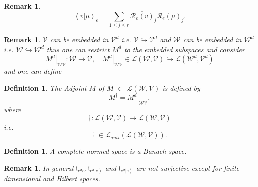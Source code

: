 \documentclass[aps,preprint]{revtex4}%
\newtheorem{definition}[theorem]{Definition}
\newtheorem{remark}[theorem]{Remark}
\begin{document}
\begin{remark}%
\begin{equation}
\left\langle \left.  v\right\vert \mu\right\rangle _{e}=\sum_{1\leq j\leq
r}\overline{\mathcal{R}_{e}\left(  v\right)  }_{j}\mathcal{R}_{e}\left(
\mu\right)  _{j}.
\end{equation}

\end{remark}

\begin{remark}
$\mathcal{V}$ can be embedded in $\mathcal{V}^{d}$ i.e.
$\mathcal{V\hookrightarrow V}^{d}$ and $\mathcal{W}$ can be embedded in
$\mathcal{W}^{d}$ i.e. $\mathcal{W\hookrightarrow W}^{d}$ thus one can
restrict $M^{d}$ to the embedded subspaces and consider
\begin{equation}
\left.  M^{d}\right\vert _{\mathcal{WV}}:\mathcal{W}\rightarrow\mathcal{V}%
,\quad\left.  M^{d}\right\vert _{\mathcal{WV}}\in\mathcal{L}\left(
\mathcal{W},\mathcal{V}\right)  \hookrightarrow\mathcal{L}\left(
\mathcal{W}^{d},\mathcal{V}^{d}\right)
\end{equation}
and one can define
\end{remark}

\begin{definition}
The \emph{Adjoint} $M^{\dagger}$of $M$ $\in$ $\mathcal{L}\left(
\mathcal{W},\mathcal{V}\right)  $ is defined by
\begin{equation}
M^{\dagger}=\left.  M^{d}\right\vert _{\mathcal{WV}},
\end{equation}
where
\begin{equation}
\dagger:\mathcal{L}\left(  \mathcal{W},\mathcal{V}\right)  \rightarrow
\mathcal{L}\left(  \mathcal{W},\mathcal{V}\right)
\end{equation}
i.e.%
\begin{equation}
\dagger\,\in\mathcal{L}_{anti}\left(  \mathcal{L}\left(  \mathcal{W}%
,\mathcal{V}\right)  \right)  .
\end{equation}

\end{definition}

\begin{definition}
A complete normed space is a Banach space.
\end{definition}

\begin{remark}
In general $\mathfrak{i}_{e^{d}e},\mathfrak{i}_{e^{d}\left\vert e\right)  }$
and $\mathfrak{i}_{e^{d}\left\vert e\right\rangle }$ are not surjective except
for finite dimensional and Hilbert spaces.
\end{remark}
\end{document}
